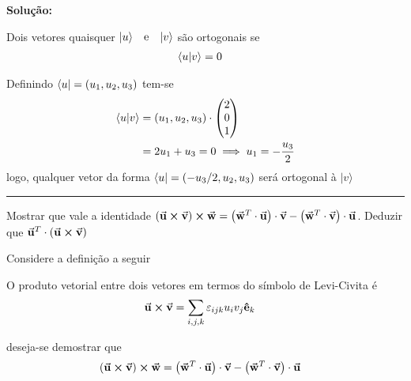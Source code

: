 \documentclass[
  a4paper,
	12pt
]{article}
\begin{document}
\textcolor{deepGreen}{\textbf{Solução:}}
\begin{definition}
	Dois vetores quaisquer $|{u}\rangle \qq{e} |{v}\rangle$ são ortogonais se
	\begin{align}
		\braket{u}{v} &= 0	
	\end{align}
\end{definition}
Definindo $\langle{u}|=\qty(u_{1},u_{2},u_{3})$ tem-se
\begin{align*}
	\braket{u}{v} &= \qty(u_{1},u_{2},u_{3})\cdot\mqty(2\\0\\1)\\
								&= 2u_{1}+u_{3}=0\implies u_{1}=-\frac{u_{3}}{2}
\end{align*}
logo, qualquer vetor da forma $\langle{u}|=\qty(-u_{3}/2,u_{2},u_{3})$ será ortogonal à $|{v}\rangle$
\begin{center}
	\noindent\textcolor{mygray}{\rule{\textwidth}{0.5pt}}
\end{center}
\begin{problem}
	Mostrar que vale a identidade $\qty(\va{u}\cp \va{v})\cp \va{w}=\qty(\va{w}^{T}\cdot \va{u})\cdot \va{v}-\qty(\va{w}^{T}\cdot \va{v})\cdot \va{u}$. Deduzir que $\va{u}^{T}\cdot\qty(\va{u}\cp \va{v})$	
\end{problem}
Considere a definição a seguir
\begin{definition}{\label{def:prod_vetorial}}
	O produto vetorial entre dois vetores em termos do símbolo de Levi-Civita é	
	\begin{align}
		\va{u}\cp \va{v} &= \sum_{i,j,k} \varepsilon_{ijk}u_{i}v_{j}\vu{e}_{k}
	\end{align}
\end{definition}
deseja-se demostrar que
\begin{align*}
	\qty(\va{u}\cp \va{v})\cp \va{w} &= \qty(\va{w}^{T}\cdot \va{u})\cdot \va{v}-\qty(\va{w}^{T}\cdot \va{v})\cdot \va{u}
\end{align*}
\end{document}
